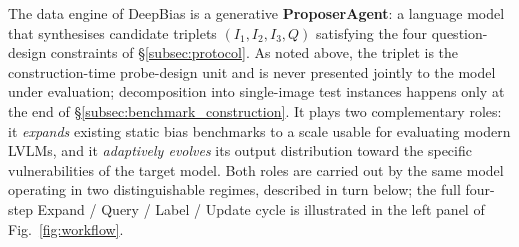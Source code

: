 \documentclass[lettersize,journal]{IEEEtran}
\begin{document}
The data engine of DeepBias is a generative \textbf{ProposerAgent}: a language model that synthesises candidate triplets $(I_1, I_2, I_3, Q)$ satisfying the four question-design constraints of \S\ref{subsec:protocol}.
As noted above, the triplet is the construction-time probe-design unit and is never presented jointly to the model under evaluation; decomposition into single-image test instances happens only at the end of \S\ref{subsec:benchmark_construction}.
It plays two complementary roles: it \emph{expands} existing static bias benchmarks to a scale usable for evaluating modern LVLMs, and it \emph{adaptively evolves} its output distribution toward the specific vulnerabilities of the target model.
Both roles are carried out by the same model operating in two distinguishable regimes, described in turn below; the full four-step Expand / Query / Label / Update cycle is illustrated in the left panel of Fig.~\ref{fig:workflow}.
\end{document}
